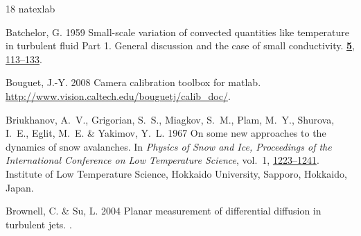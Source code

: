 \documentclass[lineno]{JFM-FLM_Au}
\begin{document}
%         
%         
%
%
\begin{thebibliography}{18}
\expandafter\ifx\csname natexlab\endcsname\relax\def\natexlab#1{#1}\fi
\def\au#1{#1} \def\ed#1{#1} \def\yr#1{#1}\def\at#1{#1}\def\jt#1{\textit{#1}}
  \def\bt#1{#1}\def\bvol#1{\textbf{#1}} \def\vol#1{#1} \def\pg#1{#1}
  \def\publ#1{#1}\def\arxiv#1{#1}\def\org#1{#1}\def\st#1{\textit{#1}}

{\sc \au{Batchelor, G.}} \yr{1959}  \at{Small-scale variation of convected
  quantities like temperature in turbulent fluid {P}art 1. {G}eneral discussion
  and the case of small conductivity.}  \jt{{}}
  \href{https://doi.org/10.1017/S002211205900009X}{ \bvol{5},  \pg{113--133}}.

{\sc \au{Bouguet, J.-Y.}} \yr{2008} Camera calibration toolbox for matlab.
  \url{http://www.vision.caltech.edu/bouguetj/calib_doc/}.

{\sc \au{Briukhanov, A.~V.}, \au{Grigorian, S.~S.}, \au{Miagkov, S.~M.},
  \au{Plam, M.~Y.}, \au{Shurova, I.~E.}, \au{Eglit, M.~E.} \& \au{Yakimov,
  Y.~L.}} \yr{1967} On some new approaches to the dynamics of snow avalanches.
  \bt{In {\em Physics of Snow and Ice, Proceedings of the International
  Conference on Low Temperature Science\/}},  \vol{vol.~1},
  \href{https://hdl.handle.net/2115/20373}{ \pg{1223--1241}}.  \publ{Institute
  of Low Temperature Science, Hokkaido University, Sapporo, Hokkaido, Japan}.

{\sc \au{Brownell, C.} \& \au{Su, L.}} \yr{2004}  \at{Planar measurement of
  differential diffusion in turbulent jets}.
  \jt{\href{https://doi.org/10.2514/6.2004-2335}{{\JournalTitle{AIAA Paper
  2004-2335}}}}.


\end{thebibliography}
\end{document}
